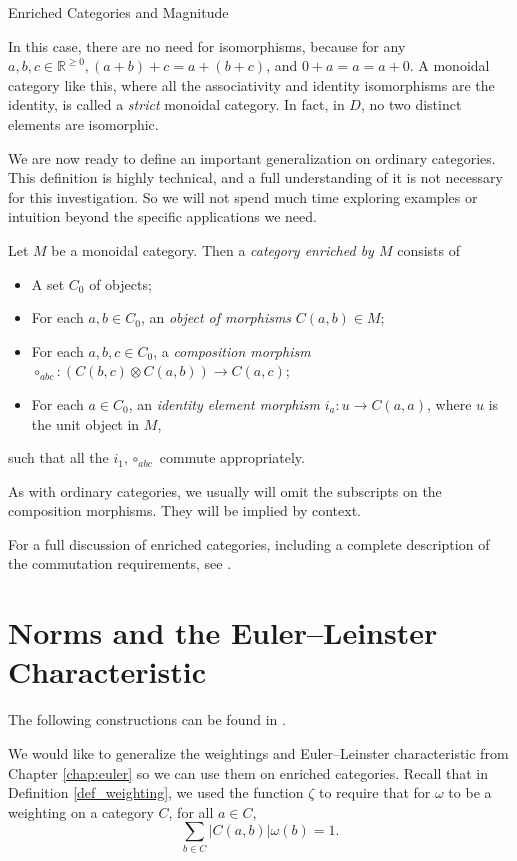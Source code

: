 \documentclass[12pt]{pom_thesis}
\newcommand{\Rr}{\mathbb{R}}
\begin{document}
\begin{chapter}{Enriched Categories and Magnitude}
\begin{examp}
In this case, there are no need for isomorphisms, because for any $a,b,c \in \Rr^{\geq 0}, (a + b) + c = a + (b + c)$, and $0 + a = a = a + 0$. A monoidal category like this, where all the associativity and identity isomorphisms are the identity, is called a \emph{strict} monoidal category. In fact, in $D$, no two distinct elements are isomorphic. 
\end{examp}
We are now ready to define an important generalization on ordinary categories. This definition is highly technical, and a full understanding of it is not necessary for this investigation. So we will not spend much time exploring examples or intuition beyond the specific applications we need.
\begin{defn}\label{en_cat}
Let $M$ be a monoidal category. Then a \emph{category enriched by $M$} consists of
\begin{itemize}
\item A set $C_0$ of objects;
\item For each $a,b \in C_0$, an \emph{object of morphisms} $C(a,b) \in M$;
\item For each $a,b,c \in C_0$, a \emph{composition morphism} $\circ_{abc}:  (C(b,c) \otimes  C(a,b)) \rightarrow  C(a,c)$;
\item For each $a \in C_0$, an \emph{identity element morphism} $i_a : u \rightarrow C(a,a)$, where $u$ is the unit object in $M$,
\end{itemize}
such that all the $i_1, \circ_{abc}$ commute appropriately.
\end{defn}
As with ordinary categories, we usually will omit the subscripts on the composition morphisms. They will be implied by context.
\begin{rmk}
For a full discussion of enriched categories, including a complete description of the commutation requirements, see \cite{Kelly1}. 
\end{rmk}

\section{Norms and the Euler--Leinster Characteristic}
The following constructions can be found in \cite{Nog1, Lein4}.

We would like to generalize the weightings and Euler--Leinster characteristic from Chapter \ref{chap:euler} so we can use them on enriched categories. Recall that in Definition \ref{def_weighting}, we used the function $\zeta$ to require that for $\omega$ to be a weighting on a category $C$, for all $a \in C$,
\[
\sum_{b \in C}|C(a,b)|\omega(b) = 1.
\]


\end{chapter}
\end{document}
